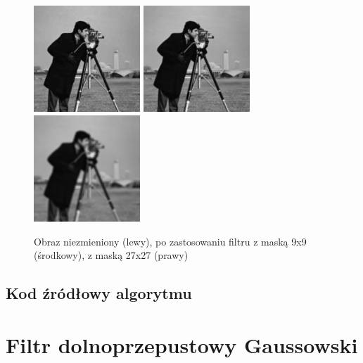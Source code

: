 \documentclass[a4paper,12pt]{book}
\begin{document}
			\begin{figure}[H]
				\caption{Obraz niezmieniony (lewy), po zastosowaniu filtru z maską 9x9 (środkowy), z maską 27x27 (prawy)}
				\includegraphics[width=4cm, height=4cm]{man-unmodified.jpg}
				\includegraphics[width=4cm, height=4cm]{man-filter-boxblur9x9.png}
				\includegraphics[width=4cm, height=4cm]{man-filter-boxblur27x27.png}
			\end{figure}
		\subsection{Kod źródłowy algorytmu}
	\section{Filtr dolnoprzepustowy Gaussowski}
\end{document}
